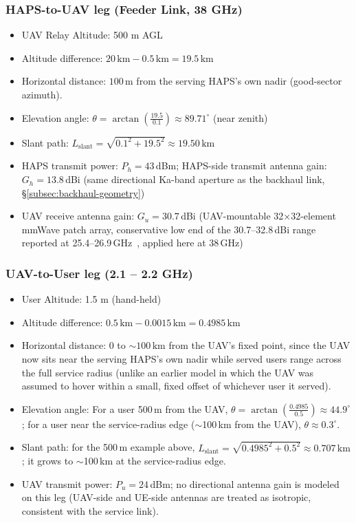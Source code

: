 \documentclass[conference]{IEEEtran}
\begin{document}
\subsubsection{HAPS-to-UAV leg (Feeder Link, 38 GHz)}
\begin{itemize}
  \item UAV Relay Altitude: 500 m AGL
  \item Altitude difference: $20\,\mathrm{km} - 0.5\,\mathrm{km} = 19.5\,\mathrm{km}$
  \item Horizontal distance: $100\,\mathrm{m}$ from the serving HAPS's own nadir (good-sector azimuth).
  \item Elevation angle: $\theta = \arctan\left(\frac{19.5}{0.1}\right) \approx 89.71^\circ$ (near zenith)
  \item Slant path: $L_{\text{slant}} = \sqrt{0.1^2 + 19.5^2} \approx 19.50\,\mathrm{km}$
  \item HAPS transmit power: $P_h = 43$\,dBm; HAPS-side transmit antenna gain: $G_h = 13.8$\,dBi (same directional Ka-band aperture as the backhaul link, \S\ref{subsec:backhaul-geometry})
  \item UAV receive antenna gain: $G_u = 30.7$\,dBi (UAV-mountable 32$\times$32-element mmWave patch array, conservative low end of the 30.7--32.8\,dBi range reported at 25.4--26.9\,GHz~\cite{anim2021uav}, applied here at 38\,GHz)
\end{itemize}

\subsubsection{UAV-to-User leg (2.1 -- 2.2 GHz)}
\begin{itemize}
  \item User Altitude: 1.5 m (hand-held)
  \item Altitude difference: $0.5\,\mathrm{km} - 0.0015\,\mathrm{km} = 0.4985\,\mathrm{km}$
  \item Horizontal distance: $0$ to $\sim\!100\,\mathrm{km}$ from the UAV's fixed point, since the UAV now sits near the serving HAPS's own nadir while served users range across the full service radius (unlike an earlier model in which the UAV was assumed to hover within a small, fixed offset of whichever user it served).
  \item Elevation angle: For a user 500\,m from the UAV, $\theta = \arctan\left(\frac{0.4985}{0.5}\right) \approx 44.9^\circ$; for a user near the service-radius edge ($\sim$100\,km from the UAV), $\theta\approx0.3^\circ$.
  \item Slant path: for the 500\,m example above, $L_{\text{slant}} = \sqrt{0.4985^2 + 0.5^2} \approx 0.707\,\mathrm{km}$; it grows to $\sim$100\,km at the service-radius edge.
  \item UAV transmit power: $P_u = 24$\,dBm; no directional antenna gain is modeled on this leg (UAV-side and UE-side antennas are treated as isotropic, consistent with the service link).
\end{itemize}
\end{document}
